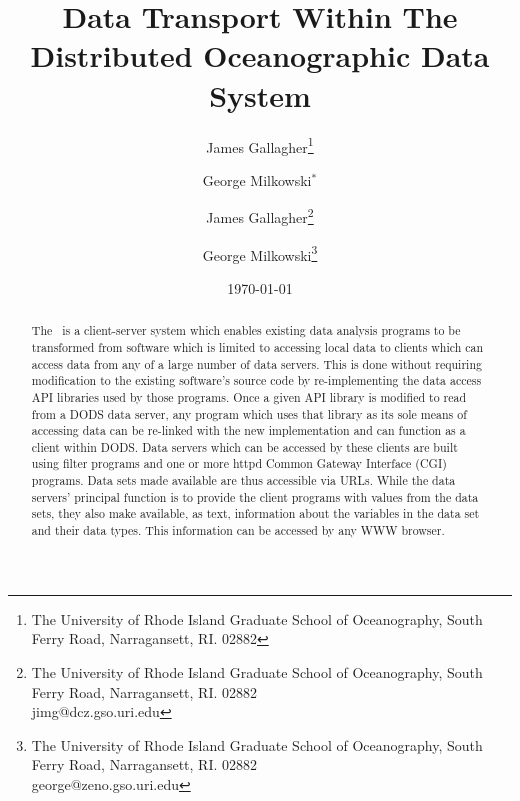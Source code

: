 
%









\begin{latexonly}
\author{James Gallagher\thanks{The University of Rhode Island Graduate School
    of Oceanography, South Ferry Road, Narragansett, RI. 02882}\\ 
  \and George Milkowski$^{*}$} 
\end{latexonly}

\begin{htmlonly}
\author{James Gallagher\thanks{The University of Rhode Island Graduate School
    of Oceanography, South Ferry Road, Narragansett, RI. 02882\\
    jimg@dcz.gso.uri.edu}\\ 
  \and George Milkowski\thanks{The University of Rhode Island Graduate School
    of Oceanography, South Ferry Road, Narragansett, RI. 02882\\
    george@zeno.gso.uri.edu}}
\end{htmlonly}

\title{Data Transport Within The Distributed Oceanographic Data System}

\date{\today}

\maketitle

\begin{abstract}

The \DODS\ is a client-server system which enables existing data analysis
programs to be transformed from software which is limited to accessing local
data to clients which can access data from any of a large number of data
servers. This is done without requiring modification to the existing
software's source code by re-implementing the data access API libraries used
by those programs. Once a given API library is modified to read from a DODS
data server, any program which uses that library as its sole means of
accessing data can be re-linked with the new implementation and can function
as a client within DODS. Data servers which can be accessed by these clients
are built using filter programs and one or more httpd Common Gateway
Interface (CGI) programs. Data sets made available are thus accessible via
URLs. While the data servers' principal function is to provide the client
programs with values from the data sets, they also make available, as text,
information about the variables in the data set and their data types. This
information can be accessed by any WWW browser.

\end{abstract}

